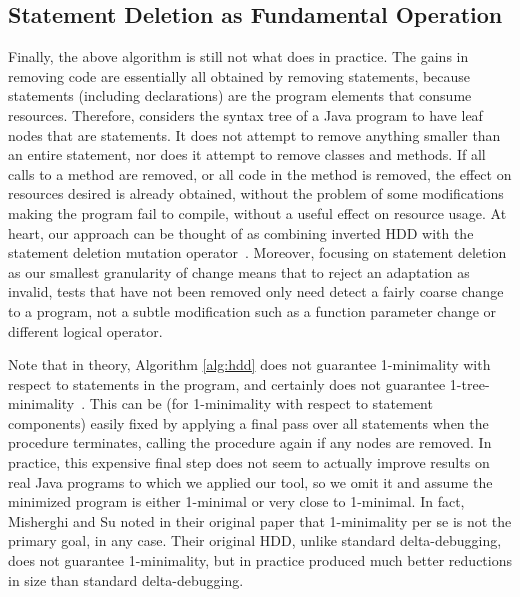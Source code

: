 \subsection{Statement Deletion as Fundamental Operation}

Finally, the above algorithm is still not what \mytool does in practice.  The
gains in removing code are essentially all obtained by removing statements,
because statements (including declarations) are the program elements that
consume resources.  Therefore, \mytool considers the syntax tree of a Java
program to have leaf nodes that are statements.  It does not attempt to remove
anything smaller than an entire statement, nor does it attempt to remove classes
and methods.  If all calls to a method are removed, or all code in the method is
removed, the effect on resources desired is already obtained, without the
problem of some modifications making the program fail to compile, without a
useful effect on resource usage.  At heart, our approach can be thought of as
combining inverted HDD with the statement deletion mutation
operator~\cite{deng2013empirical}.  Moreover, focusing on statement deletion as
our smallest granularity of change means that to reject an adaptation as
invalid, tests that have not been removed only need detect a fairly coarse
change to a program, not a subtle modification such as a function parameter
change or different logical operator.

Note that in theory, Algorithm \ref{alg:hdd} does not guarantee 1-minimality
with respect to statements in the program, and certainly does not guarantee
1-tree-minimality~\cite{misherghi2006hdd}.  This can be (for 1-minimality with
respect to statement components) easily fixed by applying a final pass over all
statements when the procedure terminates, calling the procedure again if any
nodes are removed.  In practice, this expensive final step does not seem to
actually improve results on real Java programs to which we applied our tool, so
we omit it and assume the minimized program is either 1-minimal or very close to
1-minimal.  In fact, Misherghi and Su noted in their original paper that
1-minimality per se is not the primary goal, in any case.  Their original HDD,
unlike standard delta-debugging, does not guarantee 1-minimality, but in
practice produced much better reductions in size than standard delta-debugging.
